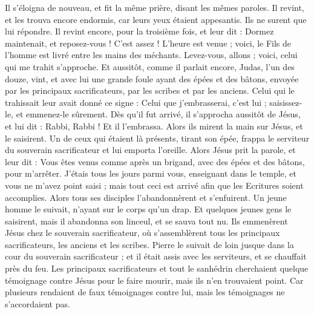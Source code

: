 \begin{multicols}{2}
Il s’éloigna de nouveau, et fit la même prière, disant les mêmes paroles.
Il revint, et les trouva encore endormis, car leurs yeux étaient appesantis. Ils ne surent que lui répondre.
Il revint encore, pour la troisième fois, et leur dit : Dormez maintenait, et reposez-vous ! C’est assez ! L’heure est venue ; voici, le Fils de l'homme est livré entre les mains des méchants.
Levez-vous, allons ; voici, celui qui me trahit s'approche.
Et aussitôt, comme il parlait encore, Judas, l'un des douze, vint, et avec lui une grande foule ayant des épées et des bâtons, envoyée par les principaux sacrificateurs, par les scribes et par les anciens.
Celui qui le trahissait leur avait donné ce signe : Celui que j'embrasserai, c’est lui ; saisissez-le, et emmenez-le sûrement.
Dès qu’il fut arrivé, il s'approcha aussitôt de Jésus, et lui dit : Rabbi, Rabbi ! Et il l’embrassa.
Alors ils mirent la main sur Jésus, et le saisirent.
Un de ceux qui étaient là présents, tirant son épée, frappa le serviteur du souverain sacrificateur et lui emporta l'oreille.
Alors Jésus prit la parole, et leur dit : Vous êtes venus comme après un brigand, avec des épées et des bâtons, pour m’arrêter.
J’étais tous les jours parmi vous, enseignant dans le temple, et vous ne m'avez point saisi ; mais tout ceci est arrivé afin que les Ecritures soient accomplies.
Alors tous ses disciples l'abandonnèrent et s'enfuirent.
Un jeune homme le suivait, n’ayant sur le corps qu’un drap. Et quelques jeunes gens le saisirent,
mais il abandonna son linceul, et se sauva tout nu.
Ils emmenèrent Jésus chez le souverain sacrificateur, où s'assemblèrent tous les principaux sacrificateurs, les anciens et les scribes.
Pierre le suivait de loin jusque dans la cour du souverain sacrificateur ; et il était assis avec les serviteurs, et se chauffait près du feu.
Les principaux sacrificateurs et tout le sanhédrin cherchaient quelque témoignage contre Jésus pour le faire mourir, mais ils n'en trouvaient point.
Car plusieurs rendaient de faux témoignages contre lui, mais les témoignages ne s’accordaient pas.

\end{multicols}
